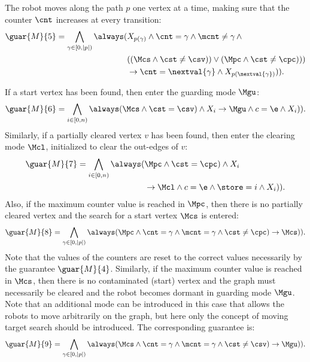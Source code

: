 The robot moves along the path $p$ one vertex at a time, making sure that the counter $\cnt$ increases at every transition:
\begin{align*}
	\guar{M}{5} = \bigwedge_{\gamma \in [0, |p|)}\always(&X_{p(\gamma)} \wedge \cnt=\gamma \wedge \mcnt\neq\gamma\,\wedge \\ &((\Mcs \wedge \next(\cst\neq\csv)) \vee (\Mpc \wedge \next(\cst\neq\cpc)))\\ & \rightarrow \next(\cnt=\nextval{\gamma} \wedge X_{p(\nextval{\gamma})})).
\end{align*}

If a start vertex has been found, then enter the guarding mode $\Mgu$:
\begin{equation*}
	\guar{M}{6} = \bigwedge_{i \in [0, n)}\always(\Mcs \wedge \next(\cst=\csv) \wedge X_i \rightarrow \next(\Mgu \wedge c=\e \wedge X_i)).
\end{equation*}
Similarly, if a partially cleared vertex $v$ has been found, then enter the clearing mode $\Mcl$, initialized to clear the out-edges of $v$:
\begin{align*}
	\guar{M}{7} = \bigwedge_{i \in [0, n)}\always(&\Mpc \wedge \next(\cst=\cpc) \wedge X_i \\ &\rightarrow \next(\Mcl \wedge c=\e \wedge \store=i \wedge X_i)).
\end{align*}
Also, if the maximum counter value is reached in $\Mpc$, then there is no partially cleared vertex and the search for a start vertex $\Mcs$ is entered:
\begin{equation*}
	\guar{M}{8} = \bigwedge_{\gamma \in [0, |p|)}\always(\Mpc \wedge \cnt=\gamma \wedge \mcnt=\gamma \wedge \next(\cst\neq\cpc) \rightarrow \next(\Mcs)).
\end{equation*}
Note that the values of the counters are reset to the correct values necessarily by the guarantee $\guar{M}{4}$. Similarly, if the maximum counter value is reached in $\Mcs$, then there is no contaminated (start) vertex and the graph must necessarily be cleared and the robot becomes dormant in guarding mode $\Mgu$. Note that an additional mode can be introduced in this case that allows the robots to move arbitrarily on the graph, but here only the concept of moving target search should be introduced. The corresponding guarantee is:
\begin{equation*}
	\guar{M}{9} = \bigwedge_{\gamma \in [0, |p|)}\always(\Mcs \wedge \cnt=\gamma \wedge \mcnt=\gamma \wedge \next(\cst\neq\csv) \rightarrow \next(\Mgu)).
\end{equation*}

